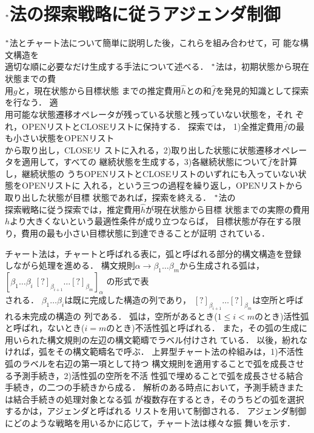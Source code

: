 \section{$^*$法の探索戦略に従うアジェンダ制御}
\label{sec:astar_chart}

$^*$法\hspace{0.1mm}と\hspace{0.1mm}チャート法について簡\hspace{0.1mm}単に説\hspace{0.1mm}明した後，\hspace{0.1mm}これらを組\hspace{0.1mm}み\hspace{0.1mm}合\hspace{0.1mm}わせて，可
\hspace{0.1mm}能な構\hspace{0.1mm}文\hspace{0.1mm}構\hspace{0.1mm}造を\\適切な順に必要なだけ生成する手法について述べる．
$^*$法は，初期状態から現在状態までの費\\用$g$と，現在状態から目標状態
までの推定費用$\hat{h}$との和$\hat{f}$を発見的知識として探索を行なう．
適\\用可能な状態遷移オペレータが残っている状態と残っていない状態を，それ
ぞれ，OPENリストとCLOSEリストに保持する．
探索では，
1)全推定費用$\hat{f}$の最も小さい状態をOPENリスト\\から取り出し，CLOSEリ
ストに入れる，2)取り出した状態に状態遷移オペレータを適用して，すべての
継続状態を生成する，3)各継続状態について$\hat{f}$を計算し，継続状態の
うちOPENリストとCLOSEリストのいずれにも入っていない状態をOPENリストに
入れる，という三つの過程を繰り返し，OPENリストから取り出した状態が目標
状態であれば，探索を終える．
$^*$法の\\探索戦略に従う探索では，推定費用$\hat{h}$が現在状態から目標
状態までの実際の費用$h$より大きくないという最適性条件が成り立つならば，
目標状態が存在する限り，費用の最も小さい目標状態に到達できることが証明
されている．

チャート法は，チャートと呼ばれる表に，弧と呼ばれる部分的構文構造を登録
しながら処理を進める．
構文規則$\alpha \rightarrow \beta_1 \ldots \beta_m$から生成される弧は，
$[\beta_1 \ldots \beta_i\ [?]_{\beta_{i+1}} \ldots [?]_{\beta_m}]_\alpha$
の形式で表\\される．
$\beta_1 \ldots \beta_i$は既に完成した構造の列であり，
$[?]_{\beta_{i+1}} \ldots [?]_{\beta_m}$は空所と呼ばれる未完成の構造の
列である．
弧は，空所があるとき($1 \le i < m$のとき)活性弧と呼ばれ，ないとき($i =
m$のとき)不活性弧と呼ばれる． 
また，その弧の生成に用いられた構文規則の左辺の構文範疇でラベル付けされ
ている．
以後，紛れなければ，弧をその構文範疇名で呼ぶ．
上昇型チャート法の枠組みは，1)不活性弧のラベルを右辺の第一項として持つ
構文規則を適用することで弧を成長させる予測手続き，2)活性弧の空所を不活
性弧で埋めることで弧を成長させる結合手続き，の二つの手続きから成る．
解析のある時点において，予測手続きまたは結合手続きの処理対象となる弧
が複数存在するとき，そのうちどの弧を選択するかは，アジェンダと呼ばれる
リストを用いて制御される．
アジェンダ制御にどのような戦略を用いるかに応じて，チャート法は様々な振
舞いを示す．

